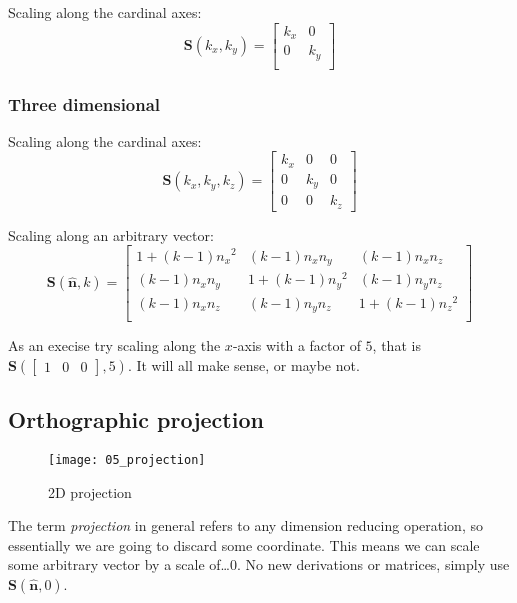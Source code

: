 Scaling along the cardinal axes: \\
$$
\mathbf{S}(k_{x},k_{y}) =
\begin{bmatrix}
k_{x} & 0 \\
0 & k_{y} \\
\end{bmatrix}
$$

\subsubsection{Three dimensional}

Scaling along the cardinal axes: \\
$$
\mathbf{S}(k_{x},k_{y},k_{z}) = 
\begin{bmatrix}
k_{x} & 0 & 0 \\
0 & k_{y} & 0 \\
0 & 0 & k_{z}
\end{bmatrix}
$$

Scaling along an arbitrary vector: \\
$$
\mathbf{S}(\hat{\mathbf{n}},k) = \begin{bmatrix}
{1 + \left( k - 1 \right){n_{x}}^{2}} & {\left( k - 1 \right)n_{x}n_{y}} & {\left( k - 1 \right)n_{x}n_{z}} \\
{\left( k - 1 \right)n_{x}n_{y}} & {1 + \left( k - 1 \right){n_{y}}^{2}} & {\left( k - 1 \right)n_{y}n_{z}} \\
{\left( k - 1 \right)n_{x}n_{z}} & {\left( k - 1 \right)n_{y}n_{z}} & {1 + \left( k - 1 \right){n_{z}}^{2}} \\
\end{bmatrix}
$$

As an execise try scaling along the $x$-axis with a factor of $5$, that is $\mathbf{S}(
\begin{bmatrix}
1 & 0 & 0
\end{bmatrix},5)$. It will all make sense, or maybe not.

\subsection{Orthographic projection}

\begin{figure}[H]
\centering
    \texttt{[image: 05\_projection]}
\caption{2D projection}
\label{fig:2d-projection}
\end{figure}

The term \textit{projection} in general refers to any dimension reducing operation, so essentially we are going to discard some coordinate. This means we can scale some arbitrary vector by a scale of\dots $0$. No new derivations or matrices, simply use $\mathbf{S}(\hat{\mathbf{n}},0)$.

